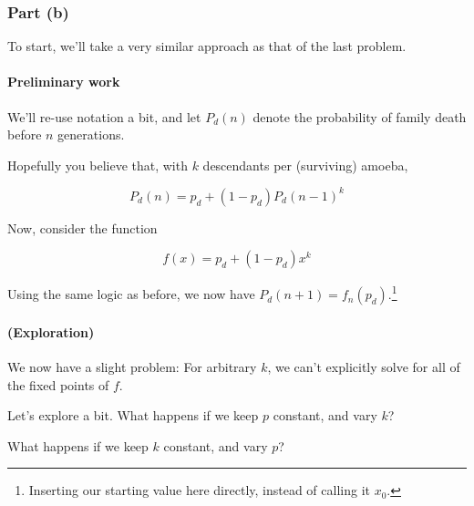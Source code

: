 \subsubsection{Part (b)}

To start, we'll take a very similar approach as that of the last problem.

\paragraph{Preliminary work}

We'll re-use notation a bit, and let $P_d(n)$ denote the probability of family death before $n$ generations. 

Hopefully you believe that, with $k$ descendants per (surviving) amoeba, 

\begin{equation*}
P_d(n) = p_d + (1 - p_d) P_d(n-1)^k
\end{equation*}

Now, consider the function 

\begin{equation}
f(x) = p_d + (1 - p_d) x^k
\end{equation} 

Using the same logic as before, we now have $P_d(n+1) = f_n(p_d)$.\footnote{Inserting our starting value here directly, instead of calling it $x_0$.}

\paragraph{(Exploration)}

We now have a slight problem: For arbitrary $k$, we can't explicitly solve for all of the fixed points of $f$. %

Let's explore a bit. What happens if we keep $p$ constant, and vary $k$?


What happens if we keep $k$ constant, and vary $p$?


%


